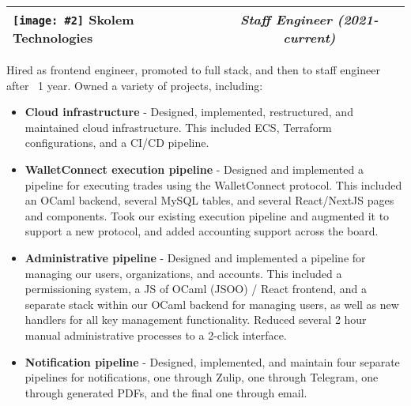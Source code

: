 \documentclass[letterpaper,10pt]{article}
\makeatletter
\newcommand{\sectiontitle}[2]{%
  \begin{tabularx}{\linewidth}{@{} X c @{}}
    {\sffamily\textbf{#1}} & {\rmfamily\textit{#2}} \\ \hline
  \end{tabularx}%
  \vspace{3pt}%
}
\newcommand{\inlineimg}[2][width=0.4cm]{%
  \begin{adjustbox}{raise=-0.2\height}%
    \texttt{[image: \#2]}%
  \end{adjustbox}%
}
\makeatother
\begin{document}
\newlength{\firstcolwidth}
\newlength{\secondcolwidth}
\setlength{\firstcolwidth}{\dimexpr(2\textwidth - 3\columnsep)/3\relax}
\setlength{\secondcolwidth}{\dimexpr(\textwidth - \columnsep)/3\relax}

\setlength{\arrayrulewidth}{0.1pt}

\begin{minipage}[t]{\firstcolwidth}
  \sectiontitle{\inlineimg[width=11pt]{assets/skolem.png} Skolem Technologies}{Staff Engineer (2021-current)}
  Hired as frontend engineer, promoted to full stack, and then to staff engineer after ~1 year. Owned a variety of projects, including:
  \begin{itemize}[leftmargin=*,label=\faCaretRight,itemsep=2pt,topsep=0pt]
    \item \textbf{Cloud infrastructure} - Designed, implemented, restructured, and maintained cloud infrastructure. This included ECS, Terraform configurations, and a CI/CD pipeline.
    \item \textbf{WalletConnect execution pipeline} - Designed and implemented a pipeline for executing trades using the WalletConnect protocol. This included an OCaml backend, several MySQL tables, and several React/NextJS pages and components. Took our existing execution pipeline and augmented it to support a new protocol, and added accounting support across the board.
    \item \textbf{Administrative pipeline} - Designed and implemented a pipeline for managing our users, organizations, and accounts. This included a permissioning system, a JS of OCaml (JSOO) / React frontend, and a separate stack within our OCaml backend for managing users, as well as new handlers for all key management functionality. Reduced several 2 hour manual administrative processes to a 2-click interface.
    \item \textbf{Notification pipeline} - Designed, implemented, and maintain four separate pipelines for notifications, one through Zulip, one through Telegram, one through generated PDFs, and the final one through email.
  \end{itemize}



\end{minipage}
\end{document}
